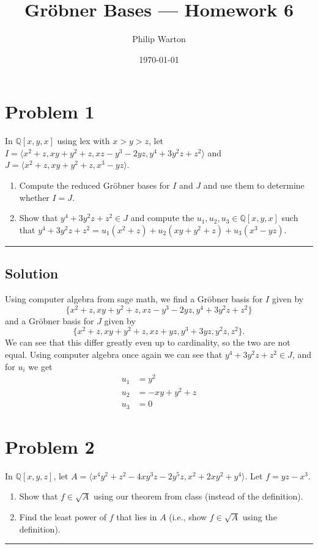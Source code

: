 \documentclass{article}
\theoremstyle{definition}
\begin{document}
\title{Gr{\"o}bner Bases --- Homework 6}
\author{Philip Warton}
\date{\today}
\maketitle
\section*{Problem 1}
In $\mathbb{Q}[x,y,x]$ using lex with $x>y>z$, let $I = \langle x^2 + z, xy + y^2 + z, xz - y^3 -2yz, y^4 + 3y^2z + z^2 \rangle $ and $J = \langle x^2 + z, xy + y^2 + z, x^3 -yz \rangle$. 
\begin{enumerate}
\item
Compute the reduced Gr\"obner bases for $I$ and $J$ and use them to determine whether $I=J$.
\item 
Show that $y^4 + 3y^2z + z^2 \in J$ and compute the $u_1,u_2,u_3 \in \mathbb{Q}[x,y,x]$ such that $y^4 + 3y^2z + z^2 = u_1(x^2 + z) + u_2(xy + y^2 + z) + u_3(x^3 -yz)$.  
\end{enumerate}
\par\noindent\rule{\textwidth}{0.4pt}
\subsection*{Solution}
Using computer algebra from sage math, we find a Gr{\"o}bner basis for $I$ given by 
\[
    \{x^2 + z, x y + y^2 + z, x z - y^3 - 2 y z, y^4 + 3 y^2 z + z^2\}  
\]
and a Gr{\"o}bner basis for $J$ given by 
\[
    \{x^2 + z, xy + y^2 + z, xz + yz, y^3 + 3yz, y^2z, z^2\}
.\]
We can see that this differ greatly even up to cardinality, so the two are not equal.
Using computer algebra once again we can see that $y^4 + 3y^2z + z^2 \in J$, and for $u_i$ we get 
\begin{align*}
    u_1 &= y^2 \\
    u_2 &= -xy + y^2 + z \\
    u_3 &= 0
\end{align*}
\section*{Problem 2}
In $\mathbb{Q}[x,y,z]$, let $A = \langle x^4y^2 + z^2 - 4xy^3z -2y^5z , x^2 + 2xy^2 + y^4 \rangle$.  Let $f = yz - x^3$.  
\begin{enumerate}
\item 
Show that $f\in \sqrt{A}$ using our theorem from class (instead of the definition).  
\item
Find the least power of $f$ that lies in $A$ (i.e., show $f\in \sqrt{A}$ using the definition). 
\end{enumerate}
\par\noindent\rule{\textwidth}{0.4pt}
\end{document}
